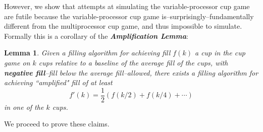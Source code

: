 \documentclass[twocolumn]{article}[11pt]
\newcommand{\defn}[1]{{\textit{\textbf{\boldmath #1}}}}
\newtheorem{lemma}{Lemma}
\begin{document}
However, we show that attempts at simulating the variable-processor cup game
are futile because the variable-processor cup game
is--surprisingly--fundamentally different from the multiprocessor cup game, and
thus impossible to simulate. Formally this is a corollary of the
\defn{Amplification Lemma}:

\begin{lemma}
  \label{lem:amplification}
  Given a filling algorithm for achieving fill $f(k)$ a cup in the cup game on
  $k$ cups relative to a baseline of the average fill of the cups, with
  \defn{negative fill}--fill below the average fill--allowed, there exists a
  filling algorithm for achieving ``amplified" fill of at least $$f'(k) =
  \frac{1}{2}(f(k/2) + f(k/4) + \cdots )$$ in one of the $k$ cups.
\end{lemma}

We proceed to prove these claims. 
\end{document}
